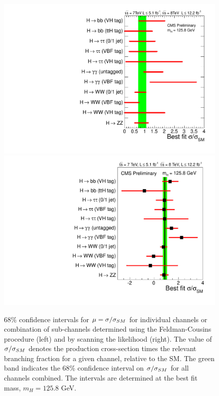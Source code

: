 \begin{figure}
\begin{center}
\includegraphics[width=.49\textwidth]{combinations/sqr_fc_ccc.pdf}
\includegraphics[width=.49\textwidth]{combinations/sqr_mlz_ccc_mH125.pdf}
\caption{68\% confidence intervals for $\mu=\sigma/\sigma_{SM}$ for individual 
channels or combination of sub-channels determined using the Feldman-Cousins procedure (left) 
and by scanning the likelihood (right). The value of $\sigma/\sigma_{SM}$ denotes
the production cross-section times the relevant branching fraction for a given 
channel, relative to the SM. The green band indicates the 68\% confidence interval
on $\sigma/\sigma_{SM}$ for all channels combined. The intervals are determined at the best fit 
mass, $m_{H}=125.8$ GeV.}
\end{center}
\label{fig:fc1d}
\end{figure}

